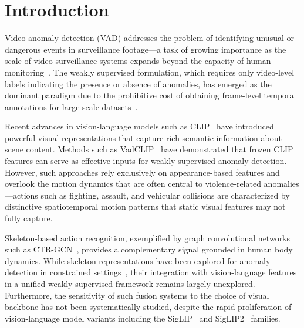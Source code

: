 \documentclass[sigconf]{acmart}
\begin{document}

\maketitle
\pagestyle{plain}

\section{Introduction}

Video anomaly detection (VAD) addresses the problem of identifying unusual or dangerous events in surveillance footage---a task of growing importance as the scale of video surveillance systems expands beyond the capacity of human monitoring~\cite{sultani2018ucfcrime}. The weakly supervised formulation, which requires only video-level labels indicating the presence or absence of anomalies, has emerged as the dominant paradigm due to the prohibitive cost of obtaining frame-level temporal annotations for large-scale datasets~\cite{tian2021rtfm}.

Recent advances in vision-language models such as CLIP~\cite{radford2021clip} have introduced powerful visual representations that capture rich semantic information about scene content. Methods such as VadCLIP~\cite{wu2024vadclip} have demonstrated that frozen CLIP features can serve as effective inputs for weakly supervised anomaly detection. However, such approaches rely exclusively on appearance-based features and overlook the motion dynamics that are often central to violence-related anomalies---actions such as fighting, assault, and vehicular collisions are characterized by distinctive spatiotemporal motion patterns that static visual features may not fully capture.

Skeleton-based action recognition, exemplified by graph convolutional networks such as CTR-GCN~\cite{chen2021ctrgcn}, provides a complementary signal grounded in human body dynamics. While skeleton representations have been explored for anomaly detection in constrained settings~\cite{doshi2022skeleton}, their integration with vision-language features in a unified weakly supervised framework remains largely unexplored. Furthermore, the sensitivity of such fusion systems to the choice of visual backbone has not been systematically studied, despite the rapid proliferation of vision-language model variants including the SigLIP~\cite{zhai2023siglip} and SigLIP2~\cite{tschannen2025siglip2} families.
\end{document}
